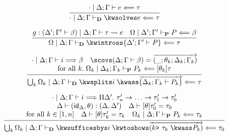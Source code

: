 %
\[
  \begin{array}{c}
  \infer{%
    \dirchkjudg{\cdot \mid\goalctx{}}{\kwsolves e}{\tau}
  }{%
    \belchkjudg{\cdot \mid \goalctx{}}{e}{\tau}
  }
    \\[1em]
  \infer{%
    \dirchkjudg{\Omega \mid\goalctx{}}{\kwintross \hypoth{\goalctx{^\prime}}{P}}{\tau}
  }{%
    \unrolljudg{\goalwith{\goalctx{^\prime}}{\beta}}{\goalctx{}}{e}{\tau}
    &
    \prfchkjudg{\Omega \mid\goalctx{^\prime}}{P}{\beta}
  }
\\[1em]
  \infer{%
    \dirchkjudg{\Union_k \Omega_k \mid\goalctx{}}{\kwsplits i\;\kwass\vec{\hypoth{\goalctx{_k}}{P_k}}}{\tau}
  }{%
    \begin{array}{c}
    \belsynjudg{\cdot \mid \goalctx{}}{i}{\beta}
      \quad
    \scovs (\Delta ; \Gamma \vdash \beta) = \vec{(\_; \theta_k; \Delta_k; \Gamma_k)}
      \\
    \text{for all $k$.}\;
    \prfchkjudg{\Omega_k \mid\goalctx{_k}}{P_k}{\msubst{\theta_k}{\tau}}
      \end{array}
  }
    \\[1em]
  \infer{%
    \dirchkjudg{\Union_k \Omega_k \mid\goalctx{}}{%
      \kwsufficesbys i\; \kwtoshows \vec{(k$\!\,$\mbox{\texttt{>}}~\tau_k \;\kwass P_k)}
    }
{\tau_0}
}{%
  \begin{array}{c}
    \belsynjudg{\cdot \mid \goalctx{}}{i}{%
      \Pi \Delta^\prime.~ \tau^\prime_n \to \ldots \to \tau^\prime_1 \to \tau^\prime_0
    }
    \\
    \Delta \proves ({\mathsf{id}}_\Delta,\theta) : (\Delta,\Delta^\prime)
    \quad
    \Delta \proves \msubst{\theta}\tau_0^\prime = \tau_0
    \\
    \text{for all $k \in [1,n]$}
    \quad
    \Delta \vdash \msubst{\theta}\tau_k^\prime = \tau_k
    \quad
    \prfchkjudg{\Omega_k \mid \goalctx{}}{P_k}{\tau_k}
  \end{array}
    }
  \end{array}
\]


